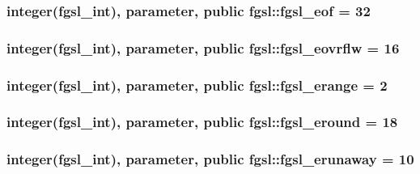 \subsubsection[{fgsl\+\_\+eof}]{\setlength{\rightskip}{0pt plus 5cm}integer({\bf fgsl\+\_\+int}), parameter, public fgsl\+::fgsl\+\_\+eof = 32}\label{namespacefgsl_a9641f79a70406a1c9f483f01fdb1ccfa}
\hypertarget{namespacefgsl_a7dc79e0a3af443223d2320c5e2b7b803}{}
\subsubsection[{fgsl\+\_\+eovrflw}]{\setlength{\rightskip}{0pt plus 5cm}integer({\bf fgsl\+\_\+int}), parameter, public fgsl\+::fgsl\+\_\+eovrflw = 16}\label{namespacefgsl_a7dc79e0a3af443223d2320c5e2b7b803}
\hypertarget{namespacefgsl_a25790738744df3ed3e0b2d50d9b30976}{}
\subsubsection[{fgsl\+\_\+erange}]{\setlength{\rightskip}{0pt plus 5cm}integer({\bf fgsl\+\_\+int}), parameter, public fgsl\+::fgsl\+\_\+erange = 2}\label{namespacefgsl_a25790738744df3ed3e0b2d50d9b30976}
\hypertarget{namespacefgsl_a46f7428fe03a54ce95e47c21d299a129}{}
\subsubsection[{fgsl\+\_\+eround}]{\setlength{\rightskip}{0pt plus 5cm}integer({\bf fgsl\+\_\+int}), parameter, public fgsl\+::fgsl\+\_\+eround = 18}\label{namespacefgsl_a46f7428fe03a54ce95e47c21d299a129}
\hypertarget{namespacefgsl_a89dc8311615f753f8b0b83a60e5f16c0}{}
\subsubsection[{fgsl\+\_\+erunaway}]{\setlength{\rightskip}{0pt plus 5cm}integer({\bf fgsl\+\_\+int}), parameter, public fgsl\+::fgsl\+\_\+erunaway = 10}\label{namespacefgsl_a89dc8311615f753f8b0b83a60e5f16c0}
\hypertarget{namespacefgsl_a9dc60d8f0ce30b7b328d703d09a0e987}{}
